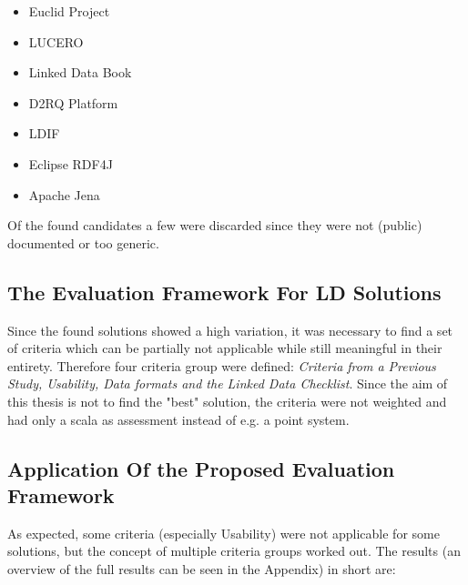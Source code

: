 \begin{itemize}
\itemsep0pt
\item Euclid Project
\item LUCERO
\item Linked Data Book
\item D2RQ Platform
\item LDIF
\item Eclipse RDF4J
\item Apache Jena
\end{itemize}

Of the found candidates a few were discarded since they were not (public) documented or too generic.

\subsection{The Evaluation Framework For LD Solutions}

Since the found solutions showed a high variation, it was necessary to find a set of criteria which can be partially not applicable while still meaningful in their entirety. Therefore four criteria group were defined: \textit{Criteria from a Previous Study, Usability, Data formats and the Linked Data Checklist}. Since the aim of this thesis is not to find the "best" solution, the criteria were not weighted and had only a scala as assessment instead of e.g. a point system.

\subsection{Application Of the Proposed Evaluation Framework}

As expected, some criteria (especially Usability) were not applicable for some solutions, but the concept of multiple criteria groups worked out. The results (an overview of the full results can be seen in the Appendix) in short are:

